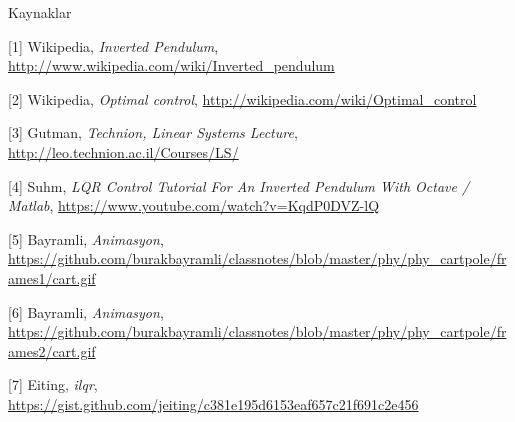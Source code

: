 \documentclass[12pt,fleqn]{article}\usepackage{../../common}
\begin{document}
Kaynaklar

[1] Wikipedia, {\em Inverted Pendulum}, \url{http://www.wikipedia.com/wiki/Inverted_pendulum}

[2] Wikipedia, {\em Optimal control}, \url{http://wikipedia.com/wiki/Optimal_control}

[3] Gutman, {\em Technion, Linear Systems Lecture}, \url{http://leo.technion.ac.il/Courses/LS/}

[4] Suhm, {\em LQR Control Tutorial For An Inverted Pendulum With Octave /
  Matlab}, \url{https://www.youtube.com/watch?v=KqdP0DVZ-lQ}

[5] Bayramli, {\em Animasyon}, \url{https://github.com/burakbayramli/classnotes/blob/master/phy/phy_cartpole/frames1/cart.gif}

[6] Bayramli, {\em Animasyon}, \url{https://github.com/burakbayramli/classnotes/blob/master/phy/phy_cartpole/frames2/cart.gif}

[7] Eiting, {\em ilqr}, \url{https://gist.github.com/jeiting/c381e195d6153eaf657c21f691c2e456}
\end{document}
